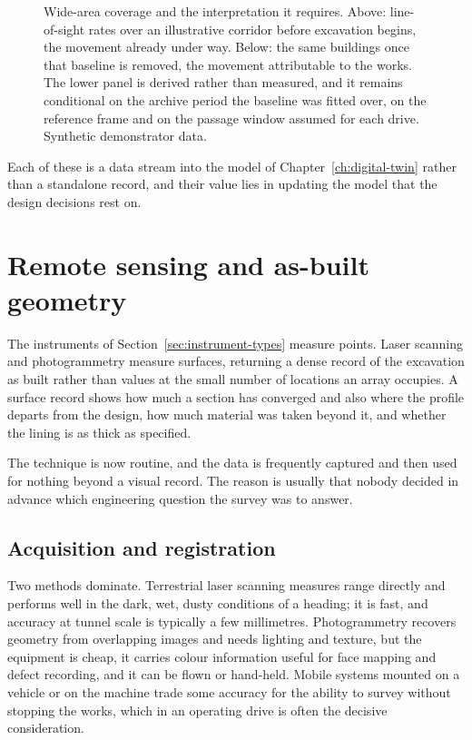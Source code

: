 \begin{figure}[htbp]
\centering
{}
\par\smallskip
{}
\caption[Wide-area radar: the baseline and what is attributed to the works]{%
Wide-area coverage and the interpretation it requires. Above: line-of-sight
rates over an illustrative corridor before excavation begins, the movement
already under way. Below: the same buildings once that baseline
is removed, the movement attributable to the works. The lower
panel is derived rather than measured, and it remains conditional on the archive
period the baseline was fitted over, on the reference frame and on the passage
window assumed for each drive. Synthetic demonstrator data.}
\label{fig:remote-baseline}
\end{figure}

Each of these is a data stream into the model of
Chapter~\ref{ch:digital-twin} rather than a standalone record, and their value
lies in updating the model that the design decisions rest on.

\section{Remote sensing and as-built geometry}
\label{sec:remote-sensing-geometry}

The instruments of Section~\ref{sec:instrument-types} measure points. Laser scanning and
photogrammetry measure surfaces, returning a dense record of the excavation as
built rather than values at the small number of locations an array
occupies. A surface record shows how
much a section has converged and also where the profile departs from the design,
how much material was taken beyond it, and whether the lining is as thick as
specified.

The technique is now routine, and the data is frequently captured and then
used for nothing beyond a visual record. The reason is usually that nobody
decided in advance which engineering question the survey was to answer.

\subsection{Acquisition and registration}
\label{sec:point-cloud-acquisition}

Two methods dominate. Terrestrial laser scanning measures range directly and
performs well in the dark, wet, dusty conditions of a heading; it is fast, and
accuracy at tunnel scale is typically a few millimetres. Photogrammetry
recovers geometry from overlapping images and needs lighting and texture, but
the equipment is cheap, it carries colour information useful for face mapping
and defect recording, and it can be flown or hand-held. Mobile systems mounted
on a vehicle or on the machine trade some accuracy for the ability to survey
without stopping the works, which in an operating drive is often the decisive
consideration.

